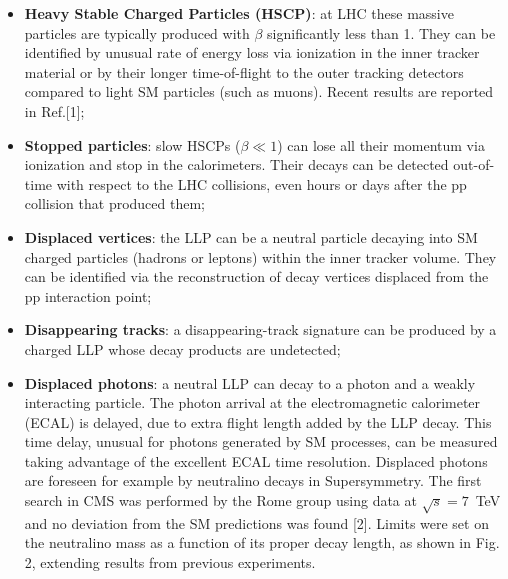 \documentclass[twocolumn,twoside,10pt,nodate]{article}
\begin{document}
\begin{itemize}
\item {\bf Heavy Stable Charged Particles (HSCP)}: at LHC these massive 
particles are typically produced with $\beta$ significantly less than
1. They can be
identified by unusual rate of energy loss via ionization in the inner
tracker material or by their 
longer time-of-flight to the outer tracking detectors
compared to light SM particles (such as muons). 
Recent results are reported in Ref.[1];
\item {\bf Stopped particles}: slow HSCPs ($\beta \ll 1$) can lose all 
their momentum via ionization and stop in the calorimeters. 
  Their decays can be detected out-of-time with respect to the
  LHC collisions, even hours or days after the pp collision that produced
  them;
\item {\bf Displaced vertices}: the LLP can be a neutral particle
  decaying into SM charged particles (hadrons or leptons) within the
  inner tracker volume. They can be identified via the reconstruction
  of decay vertices displaced from the pp interaction point;
\item {\bf Disappearing tracks}: a disappearing-track signature can be produced by a
  charged LLP whose decay products are undetected;
\item {\bf Displaced photons}: a neutral LLP can decay to a photon and a weakly
  interacting particle. 
The photon arrival at
  the electromagnetic calorimeter (ECAL) is delayed, due to extra flight
  length added by the LLP decay. This time delay, unusual for photons
  generated by SM processes, can be measured taking advantage of the
  excellent ECAL time resolution. Displaced photons are foreseen for
  example by neutralino decays in Supersymmetry. 
The first search in CMS was performed by the Rome group using data at
$\sqrt{s}=7$~TeV and no deviation from the SM predictions was found [2].
Limits were set on the neutralino mass as a function of its proper
decay length, as shown in Fig. 2, extending results from previous experiments.
\end{itemize}
\end{document}
